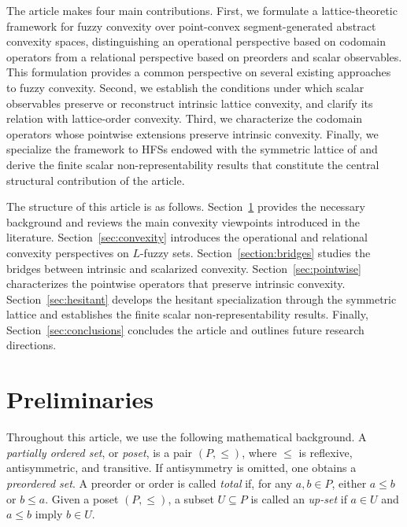 \documentclass[11pt,a4paper]{article}
\begin{document}
\smallskip

The article makes four main contributions. First, we formulate a lattice-theoretic framework for fuzzy convexity over point-convex segment-generated abstract convexity spaces, distinguishing an operational perspective based on codomain operators from a relational perspective based on preorders and scalar observables. This formulation provides a common perspective on several existing approaches to fuzzy convexity. Second, we establish the conditions under which scalar observables preserve or reconstruct intrinsic lattice convexity, and clarify its relation with lattice-order convexity. Third, we characterize the codomain operators whose pointwise extensions preserve intrinsic convexity. Finally, we specialize the framework to HFSs endowed with the symmetric lattice of \citet{JMNS22} and derive the finite scalar non-representability results that constitute the central structural contribution of the article.

\smallskip

The structure of this article is as follows. Section~\ref{sec:preliminaries} provides the necessary background and reviews the main convexity viewpoints introduced in the literature. Section~\ref{sec:convexity} introduces the operational and relational convexity perspectives on \(L\)-fuzzy sets. Section~\ref{section:bridges} studies the bridges between intrinsic and scalarized convexity. Section~\ref{sec:pointwise} characterizes the pointwise operators that preserve intrinsic convexity. Section~\ref{sec:hesitant} develops the hesitant specialization through the symmetric lattice and establishes the finite scalar non-representability results. Finally, Section~\ref{sec:conclusions} concludes the article and outlines future research directions.





\section{Preliminaries}\label{sec:preliminaries}


Throughout this article, we use the following mathematical background. A \emph{partially ordered set}, or \emph{poset}, is a pair \((P,\leq)\), where \(\leq\) is reflexive, antisymmetric, and transitive. If antisymmetry is omitted, one obtains a \emph{preordered set}. A preorder or order is called \emph{total} if, for any \(a,b\in P\), either \(a\leq b\) or \(b\leq a\). Given a poset \((P,\leq)\), a subset \(U\subseteq P\) is called an \emph{up-set} if \(a\in U\) and \(a\leq b\) imply \(b\in U\).
\end{document}

